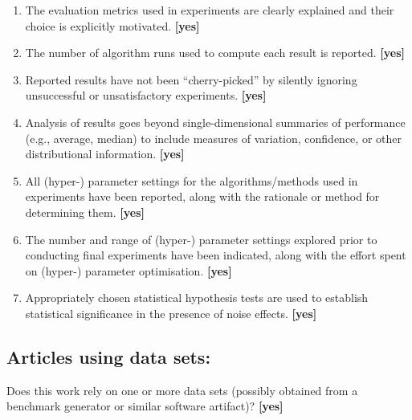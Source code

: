 \documentclass[manuscript, screen, review]{jair}
\begin{document}
\begin{enumerate}
    \textbf{[partially]}
    \item The evaluation metrics used in experiments are clearly explained and their choice is explicitly motivated.
    \textbf{[yes]}
    \item The number of algorithm runs used to compute each result is reported.
    \textbf{[yes]}
    \item Reported results have not been ``cherry-picked'' by silently ignoring unsuccessful or unsatisfactory experiments.
    \textbf{[yes]}
    \item Analysis of results goes beyond single-dimensional summaries of performance (e.g., average, median) to include measures of variation, confidence, or other distributional information.
    \textbf{[yes]}
    \item All (hyper-) parameter settings for the algorithms/methods used in experiments have been reported, along with the rationale or method for determining them.
    \textbf{[yes]}
    \item The number and range of (hyper-) parameter settings explored prior to conducting final experiments have been indicated, along with the effort spent on (hyper-) parameter optimisation.
    \textbf{[yes]}
    \item Appropriately chosen statistical hypothesis tests are used to establish statistical significance in the presence of noise effects.
    \textbf{[yes]}
\end{enumerate}

\subsection*{Articles using data sets:}
Does this work rely on one or more data sets (possibly obtained from a benchmark generator or similar software artifact)?
\textbf{[yes]}
\end{document}
